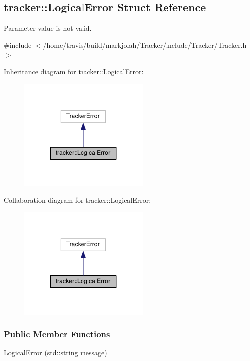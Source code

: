 \hypertarget{structtracker_1_1LogicalError}{}\subsection{tracker\+:\+:Logical\+Error Struct Reference}
\label{structtracker_1_1LogicalError}


Parameter value is not valid.  




{\ttfamily \#include $<$/home/travis/build/markjolah/\+Tracker/include/\+Tracker/\+Tracker.\+h$>$}



Inheritance diagram for tracker\+:\+:Logical\+Error\+:\nopagebreak
\begin{figure}[H]
\begin{center}
\leavevmode
\includegraphics[width=179pt]{structtracker_1_1LogicalError__inherit__graph}
\end{center}
\end{figure}


Collaboration diagram for tracker\+:\+:Logical\+Error\+:\nopagebreak
\begin{figure}[H]
\begin{center}
\leavevmode
\includegraphics[width=179pt]{structtracker_1_1LogicalError__coll__graph}
\end{center}
\end{figure}
\subsubsection*{Public Member Functions}
\begin{DoxyCompactItemize}
\item 
\hyperlink{structtracker_1_1LogicalError_ac5057f6383f4c192f123d8316cd2044d}{Logical\+Error} (std\+::string message)
\end{DoxyCompactItemize}


